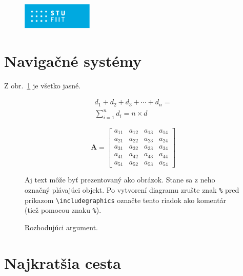\documentclass[10pt,twocolumn,twoside,slovak,a4paper]{article}
\begin{document}
\begin{figure}[h]
  \centering
  \includegraphics[width=0.3\textwidth]{logofiit.png}
\end{figure}

\section{Navigačné systémy} \label{nejaka}

Z obr.~\ref{f:rozhod} je všetko jasné. 


\begin{multline}
d_1 + d_2 + d_3 + \cdots + d_n = \\
\sum_{i=1}^{n} d_i = n \times d
\end{multline}

\[ %
\mathbf{A} = \begin{bmatrix}
a_{11} & a_{12} & a_{13} & a_{14} \\
a_{21} & a_{22} & a_{23} & a_{24} \\
a_{31} & a_{32} & a_{33} & a_{34} \\
a_{41} & a_{42} & a_{43} & a_{44} \\
a_{51} & a_{52} & a_{53} & a_{54}
\end{bmatrix}
\]



\begin{figure}[tbh]
\centering
Aj text môže byť prezentovaný ako obrázok. Stane sa z neho označný plávajúci objekt. Po vytvorení diagramu zrušte znak \texttt{\%} pred príkazom \verb|\includegraphics| označte tento riadok ako komentár (tiež pomocou znaku \texttt{\%}).
\caption{Rozhodujúci argument.}
\label{f:rozhod}
\end{figure}




\section{Najkratšia cesta} \label{najkratsiaCesta}
\end{document}
